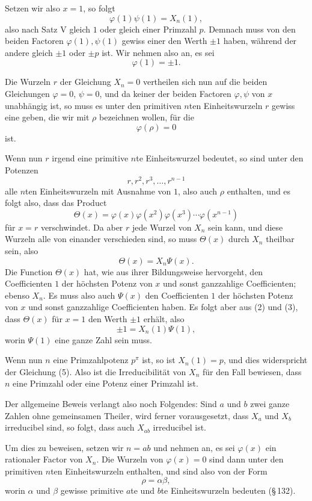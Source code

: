 \documentclass[11pt]{article}
\begin{document}
Setzen wir also $x=1$, so folgt
\[
        \varphi(1)\psi(1)=X_n(1),
\]
also nach Satz V gleich $1$ oder gleich einer Primzahl $p$. Demnach muss von den beiden Factoren $\varphi(1),\psi(1)$ gewiss einer den Werth $\pm1$ haben, während der andere gleich $\pm1$ oder $\pm p$ ist. Wir nehmen also an, es sei
\[
\tag{2}        \varphi(1)=\pm1.
\]

Die Wurzeln $r$ der Gleichung $X_n=0$ vertheilen sich nun auf die beiden Gleichungen $\varphi=0$, $\psi=0$, und da keiner der beiden Factoren $\varphi,\psi$ von $x$ unabhängig ist, so muss es unter den primitiven $n$ten Einheitswurzeln $r$ gewiss eine geben, die wir mit $\rho$ bezeichnen wollen, für die
\[
        \varphi(\rho)=0
\]
ist.

Wenn nun $r$ irgend eine primitive $n$te Einheitswurzel bedeutet, so sind unter den Potenzen
\[
        r,r^2,r^3,\ldots,r^{n-1}
\]
alle $n$ten Einheitswurzeln mit Ausnahme von $1$, also auch $\rho$ enthalten, und es folgt also, dass das Product
\[
\tag{3}        \Theta(x)=\varphi(x)\varphi(x^2)\varphi(x^3)\cdots\varphi(x^{n-1})
\]
für $x=r$ verschwindet. Da aber $r$ jede Wurzel von $X_n$ sein kann, und diese Wurzeln alle von einander verschieden sind, so muss $\Theta(x)$ durch $X_n$ theilbar sein, also
\[
\tag{4}        \Theta(x)=X_n\Psi(x).
\]
Die Function $\Theta(x)$ hat, wie aus ihrer Bildungsweise hervorgeht, den Coefficienten $1$ der höchsten Potenz von $x$ und sonst ganzzahlige Coefficienten; ebenso $X_n$. Es muss also auch $\Psi(x)$ den Coefficienten $1$ der höchsten Potenz von $x$ und sonst ganzzahlige Coefficienten haben. Es folgt aber aus (2) und (3), dass $\Theta(x)$ für $x=1$ den Werth $\pm1$ erhält, also
\[
\tag{5}        \pm1=X_n(1)\Psi(1),
\]
worin $\Psi(1)$ eine ganze Zahl sein muss.

Wenn nun $n$ eine Primzahlpotenz $p^\pi$ ist, so ist $X_n(1)=p$, und dies widerspricht der Gleichung (5). Also ist die Irreducibilität von $X_n$ für den Fall bewiesen, dass $n$ eine Primzahl oder eine Potenz einer Primzahl ist.

Der allgemeine Beweis verlangt also noch Folgendes: Sind $a$ und $b$ zwei ganze Zahlen ohne gemeinsamen Theiler, wird ferner vorausgesetzt, dass $X_a$ und $X_b$ irreducibel sind, so folgt, dass auch $X_{ab}$ irreducibel ist.

Um dies zu beweisen, setzen wir $n=ab$ und nehmen an, es sei $\varphi(x)$ ein rationaler Factor von $X_n$. Die Wurzeln von $\varphi(x)=0$ sind dann unter den primitiven $n$ten Einheitswurzeln enthalten, und sind also von der Form
\[
\tag{6}        \rho=\alpha\beta,
\]
worin $\alpha$ und $\beta$ gewisse primitive $a$te und $b$te Einheitswurzeln bedeuten (\S\,132).
\end{document}
